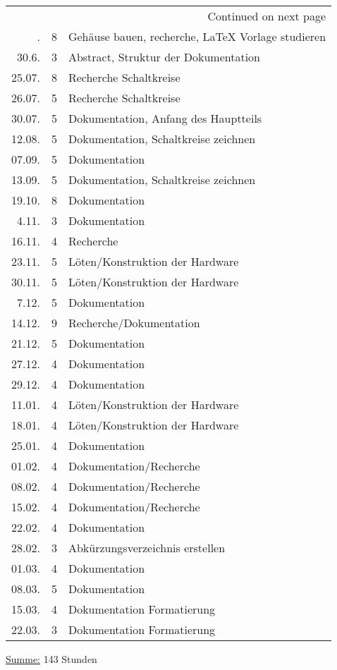 \begin{longtable}{rrl}
\hline
\endhead
\hline\multicolumn{3}{r}{Continued on next page} \\
\endfoot
\endlastfoot
\hline
26.6. & 8 & Gehäuse bauen, recherche, \LaTeX{} Vorlage studieren\\
30.6. & 3 & Abstract, Struktur der Dokumentation\\
25.07. & 8 & Recherche Schaltkreise\\
26.07. & 5 & Recherche Schaltkreise\\
30.07. & 5 & Dokumentation, Anfang des Hauptteils\\
12.08. & 5 & Dokumentation, Schaltkreise zeichnen\\
07.09. & 5 & Dokumentation\\
13.09. & 5 & Dokumentation, Schaltkreise zeichnen\\
19.10. & 8 & Dokumentation\\
4.11. & 3 & Dokumentation\\
16.11. & 4 & Recherche\\
23.11. & 5 & Löten/Konstruktion der Hardware\\
30.11. & 5 & Löten/Konstruktion der Hardware\\
7.12. & 5 & Dokumentation\\
14.12. & 9 & Recherche/Dokumentation\\
21.12. & 5 & Dokumentation\\
27.12. & 4 & Dokumentation\\
29.12. & 4 & Dokumentation\\
11.01. & 4 & Löten/Konstruktion der Hardware\\
18.01. & 4 & Löten/Konstruktion der Hardware\\
25.01. & 4 & Dokumentation\\
01.02. & 4 & Dokumentation/Recherche\\
08.02. & 4 & Dokumentation/Recherche\\
15.02. & 4 & Dokumentation/Recherche\\
22.02. & 4 & Dokumentation\\
28.02. & 3 & Abkürzungsverzeichnis erstellen\\
01.03. & 4 & Dokumentation\\
08.03. & 5 & Dokumentation\\
15.03. & 4 & Dokumentation Formatierung\\
22.03. & 3 & Dokumentation Formatierung\\
\hline
\end{longtable}
\uline{Summe:} 143 Stunden

